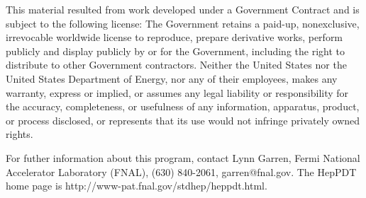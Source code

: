 This material resulted from work developed under a Government Contract
and is subject to the following license:  The Government retains a
paid-up, nonexclusive, irrevocable worldwide license to reproduce,
prepare derivative works, perform publicly and display publicly by or for
the Government,  including the right to distribute to other Government
contractors.  Neither the United States nor the United States Department
of Energy, nor any of their employees, makes any warranty, express or
implied, or assumes any legal liability or responsibility for the
accuracy, completeness, or usefulness of any  information, apparatus,
product, or process disclosed, or represents that its use would not
infringe privately owned rights.
 
For futher information about this program, contact Lynn Garren,
Fermi National Accelerator Laboratory (FNAL), (630) 840-2061,
garren@fnal.gov.  The HepPDT home page is 
http://www-pat.fnal.gov/stdhep/heppdt.html.

\newpage

\setcounter{page}{1}
\tableofcontents

\cleardoublepage
